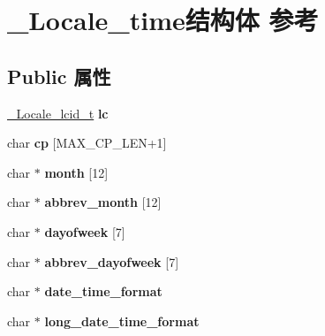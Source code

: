 \hypertarget{struct___locale__time}{}\section{\+\_\+\+Locale\+\_\+time结构体 参考}
\label{struct___locale__time}
\subsection*{Public 属性}
\begin{DoxyCompactItemize}
\item 
\mbox{\label{struct___locale__time_ad621831bfd45d4838f274525661a479a}} 
\hyperlink{struct___locale__name__hint}{\+\_\+\+Locale\+\_\+lcid\+\_\+t} {\bfseries lc}
\item 
\mbox{\label{struct___locale__time_af219385ca0bfbc2be81aae34d7fcd6d6}} 
char {\bfseries cp} \mbox{[}M\+A\+X\+\_\+\+C\+P\+\_\+\+L\+EN+1\mbox{]}
\item 
\mbox{\label{struct___locale__time_a5b35ae5a81328c8e41072f3dc65e2003}} 
char $\ast$ {\bfseries month} \mbox{[}12\mbox{]}
\item 
\mbox{\label{struct___locale__time_a870b10d09cd037bb882f8790a4cf59f5}} 
char $\ast$ {\bfseries abbrev\+\_\+month} \mbox{[}12\mbox{]}
\item 
\mbox{\label{struct___locale__time_a2b53c56f09c5b99ef20dd42cd4551702}} 
char $\ast$ {\bfseries dayofweek} \mbox{[}7\mbox{]}
\item 
\mbox{\label{struct___locale__time_ab33199880e9ff2efdc122df89d1cee70}} 
char $\ast$ {\bfseries abbrev\+\_\+dayofweek} \mbox{[}7\mbox{]}
\item 
\mbox{\label{struct___locale__time_ad0f9e56b3cfc5ecc7aa62ba23a397d95}} 
char $\ast$ {\bfseries date\+\_\+time\+\_\+format}
\item 
\mbox{\label{struct___locale__time_ac427f7f3fe88ef81dac27a605eba9134}} 
char $\ast$ {\bfseries long\+\_\+date\+\_\+time\+\_\+format}
\item 

\end{DoxyCompactItemize}
